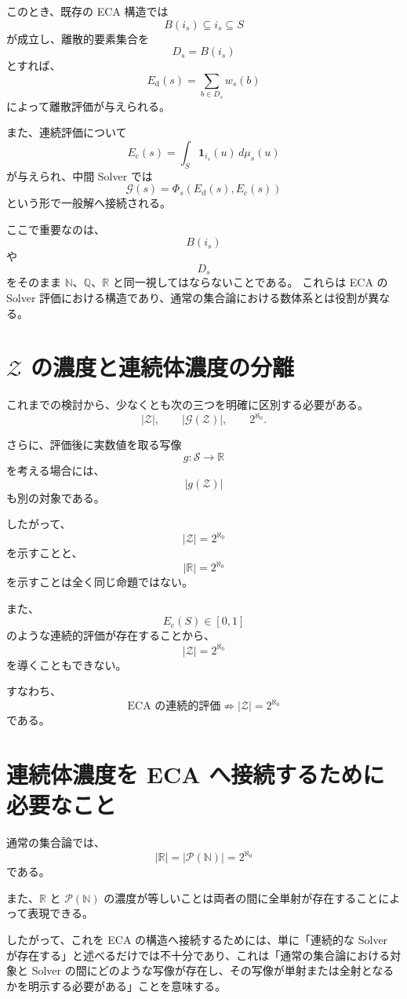 \documentclass[a4paper,11pt]{article}
\begin{document}
このとき、既存の ECA 構造では
\[
B(i_s)\subseteq i_s\subseteq S
\]
が成立し、離散的要素集合を
\[
D_s=B(i_s)
\]
とすれば、
\[
E_{\mathrm d}(s)
=
\sum_{b\in D_s}w_s(b)
\]
によって離散評価が与えられる。

また、連続評価について
\[
E_{\mathrm c}(s)
=
\int_S\mathbf{1}_{i_s}(u)\,d\mu_s(u)
\]
が与えられ、中間 Solver では
\[
\mathcal{G}(s)
=
\Phi_s
\left(
E_{\mathrm d}(s),
E_{\mathrm c}(s)
\right)
\]
という形で一般解へ接続される。

ここで重要なのは、
\[
B(i_s)
\]
や
\[
D_s
\]
をそのまま $\mathbb{N}$、$\mathbb{Q}$、$\mathbb{R}$ と同一視してはならないことである。
これらは ECA の Solver 評価における構造であり、通常の集合論における数体系とは役割が異なる。

\section{$\mathcal{Z}$ の濃度と連続体濃度の分離}

これまでの検討から、少なくとも次の三つを明確に区別する必要がある。
\[
|\mathcal{Z}|,
\qquad
|\mathcal{G}(\mathcal{Z})|,
\qquad
2^{\aleph_0}.
\]

さらに、評価後に実数値を取る写像
\[
g:\mathcal{S}\longrightarrow\mathbb{R}
\]
を考える場合には、
\[
|g(\mathcal{Z})|
\]
も別の対象である。

したがって、
\[
|\mathcal{Z}|=2^{\aleph_0}
\]
を示すことと、
\[
|\mathbb{R}|=2^{\aleph_0}
\]
を示すことは全く同じ命題ではない。

また、
\[
E_{\mathrm c}(S)\in[0,1]
\]
のような連続的評価が存在することから、
\[
|\mathcal{Z}|=2^{\aleph_0}
\]
を導くこともできない。

すなわち、
\[
\boxed{
\text{ECA の連続的評価}
\not\Rightarrow
|\mathcal{Z}|=2^{\aleph_0}
}
\]
である。

\section{連続体濃度を ECA へ接続するために必要なこと}

通常の集合論では、
\[
|\mathbb{R}|
=
|\mathcal{P}(\mathbb{N})|
=
2^{\aleph_0}
\]
である。

また、$\mathbb{R}$ と $\mathcal{P}(\mathbb{N})$ の濃度が等しいことは両者の間に全単射が存在することによって表現できる。

したがって、これを ECA の構造へ接続するためには、単に「連続的な Solver が存在する」と述べるだけでは不十分であり、これは「通常の集合論における対象と Solver の間にどのような写像が存在し、その写像が単射または全射となるかを明示する必要がある」ことを意味する。
\end{document}
